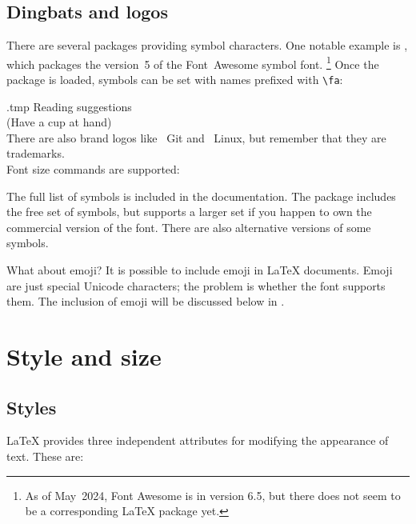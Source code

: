 %
%
\subsection{Dingbats and logos}

There are several packages providing symbol characters.
One notable example is ,
which packages the version~5 of the Font~Awesome symbol font.%
\footnote{As of May~2024, Font Awesome is in version 6.5,
but there does not seem to be a corresponding \LaTeX{} package yet.}
Once the package is loaded, symbols can be set with names prefixed with \verb|\fa|:
%
\begin{VerbatimOut}{\jobname.tmp}
\faBook{} Reading suggestions\\
\faCoffee{} (Have a cup at hand)\\

There are also brand logos like
\faGit*~Git and \faLinux~Linux,
but remember that they are trademarks.\\

Font size commands are supported:
{\tiny\faPoop}~{\faPoop}~{\Large\faPoop}
\end{VerbatimOut}
\ShowExample
%
The full list of symbols is included in the documentation.
The package includes the free set of symbols,
but supports a larger set if you happen to own the commercial version of the font.
There are also alternative versions of some symbols.


What about emoji?
It is possible to include emoji in \LaTeX{} documents.
Emoji are just special Unicode characters;
the problem is whether the font supports them.
The inclusion of emoji will be discussed below in .


%
%
%
\section{Style and size}

\subsection{Styles}
\LaTeX{} provides three independent attributes for modifying the appearance of text.
These are:

